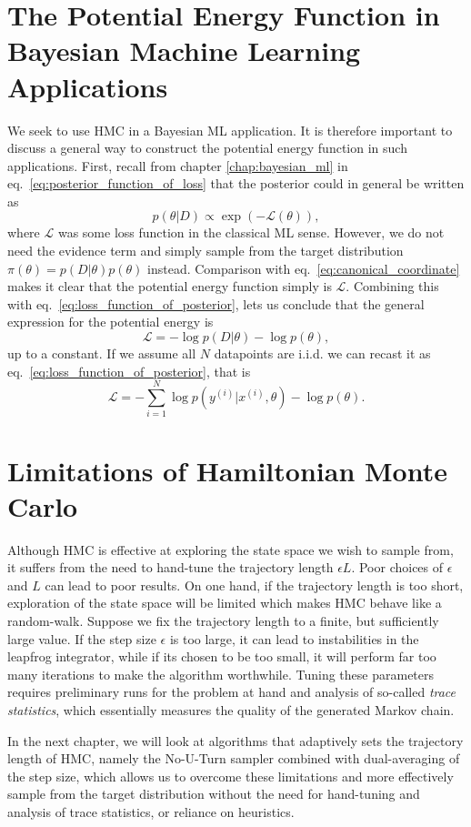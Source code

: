 \section{The Potential Energy Function in Bayesian Machine Learning Applications}
We seek to use HMC in a Bayesian ML application. It is therefore important to
discuss a general way to construct the potential energy function in such applications.
First, recall from chapter \ref{chap:bayesian_ml} in eq.~\eqref{eq:posterior_function_of_loss} that the posterior could in general be written as
\begin{equation}
  p(\theta|D) \propto \exp\left(-\mathcal{L}(\theta)\right),
\end{equation}
where $\mathcal{L}$ was some loss function in the classical ML sense.
However, we do not need the evidence term and simply sample from the target distribution $\pi(\theta) = p(D|\theta)p(\theta)$ instead.
Comparison with eq.~\eqref{eq:canonical_coordinate} makes it clear that the potential energy
function simply is $\mathcal{L}$. Combining this with eq.~\eqref{eq:loss_function_of_posterior}, lets us conclude that the general expression
for the potential energy is
\begin{equation}
  \mathcal{L} = - \log p(D|\theta) - \log p(\theta),
\end{equation}
up to a constant.
If we assume all $N$ datapoints are i.i.d. we can recast it as eq.~\eqref{eq:loss_function_of_posterior}, that is
\begin{equation}\label{eq:potential_energy_bayesian}
  \mathcal{L} = -\sum_{i=1}^N \log p(y^{(i)}|x^{(i)}, \theta) - \log p(\theta).
\end{equation}

\section{Limitations of Hamiltonian Monte Carlo}
Although HMC is effective at exploring the state space we wish to sample from, it suffers from the need to hand-tune
the trajectory length $\epsilon L$. Poor choices of $\epsilon$ and $L$ can lead to poor results.
On one hand, if the trajectory length is too short, exploration of the state space will be limited 
which makes HMC behave like a random-walk. Suppose we fix the trajectory length to a finite,
but sufficiently large value.
If the step size $\epsilon$ is too large,
it can lead to instabilities in the leapfrog integrator, while if its chosen to be too small, it will perform far too many
iterations to make the algorithm worthwhile. 
Tuning these parameters requires preliminary runs for the problem at hand and analysis of so-called \textit{trace statistics}, 
which essentially measures the quality of the generated Markov chain. 

In the next chapter, we will look at algorithms that adaptively sets the trajectory length of HMC,
namely the No-U-Turn sampler combined with dual-averaging of the step size, which allows us to overcome these
limitations and more effectively sample from the target distribution without the need for hand-tuning
and analysis of trace statistics, or reliance on heuristics.

